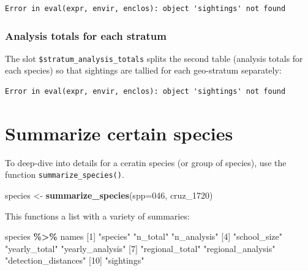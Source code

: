\documentclass[
]{book}
\newenvironment{Shaded}{\begin{snugshade}}{\end{snugshade}}
\newcommand{\AttributeTok}[1]{\textcolor[rgb]{0.13,0.29,0.53}{#1}}
\newcommand{\DecValTok}[1]{\textcolor[rgb]{0.00,0.00,0.81}{#1}}
\newcommand{\FunctionTok}[1]{\textcolor[rgb]{0.13,0.29,0.53}{\textbf{#1}}}
\newcommand{\NormalTok}[1]{#1}
\newcommand{\OtherTok}[1]{\textcolor[rgb]{0.56,0.35,0.01}{#1}}
\newcommand{\SpecialCharTok}[1]{\textcolor[rgb]{0.81,0.36,0.00}{\textbf{#1}}}
\newcommand{\StringTok}[1]{\textcolor[rgb]{0.31,0.60,0.02}{#1}}
\begin{document}
\begin{verbatim}
Error in eval(expr, envir, enclos): object 'sightings' not found
\end{verbatim}

\hypertarget{analysis-totals-for-each-stratum}{%
\subsubsection*{Analysis totals for each stratum}\label{analysis-totals-for-each-stratum}}

The slot \texttt{\$stratum\_analysis\_totals} splits the second table (analysis totals for each species) so that sightings are tallied for each geo-stratum separately:

\begin{verbatim}
Error in eval(expr, envir, enclos): object 'sightings' not found
\end{verbatim}

\hypertarget{summarize-certain-species}{%
\section*{Summarize certain species}\label{summarize-certain-species}}

To deep-dive into details for a ceratin species (or group of species), use the function \texttt{summarize\_species()}.

\begin{Shaded}
\begin{Highlighting}[]
\NormalTok{species }\OtherTok{\textless{}{-}} \FunctionTok{summarize\_species}\NormalTok{(}\AttributeTok{spp=}\StringTok{\textquotesingle{}046\textquotesingle{}}\NormalTok{, cruz\_1720)}
\end{Highlighting}
\end{Shaded}

This functions a list with a variety of summaries:

\begin{Shaded}
\begin{Highlighting}[]
\NormalTok{species }\SpecialCharTok{\%\textgreater{}\%}\NormalTok{ names}
\NormalTok{ [}\DecValTok{1}\NormalTok{] }\StringTok{"species"}             \StringTok{"n\_total"}             \StringTok{"n\_analysis"}         
\NormalTok{ [}\DecValTok{4}\NormalTok{] }\StringTok{"school\_size"}         \StringTok{"yearly\_total"}        \StringTok{"yearly\_analysis"}    
\NormalTok{ [}\DecValTok{7}\NormalTok{] }\StringTok{"regional\_total"}      \StringTok{"regional\_analysis"}   \StringTok{"detection\_distances"}
\NormalTok{[}\DecValTok{10}\NormalTok{] }\StringTok{"sightings"}          
\end{Highlighting}
\end{Shaded}
\end{document}
